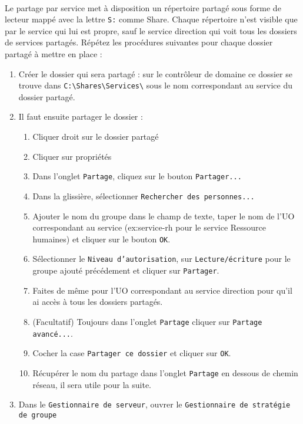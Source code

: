 			\paragraph{}
				Le partage par service met à disposition un répertoire partagé sous forme de lecteur mappé avec la lettre \texttt{S:} comme Share. Chaque répertoire n'est visible que par le service qui lui est propre, sauf le service direction qui voit tous les dossiers de services partagés. Répétez les procédures suivantes pour chaque dossier partagé à mettre en place :
				\begin{enumerate}
					\item Créer le dossier qui sera partagé : sur le contrôleur de domaine ce dossier se trouve dans \texttt{C:\textbackslash{}Shares\textbackslash{}Services\textbackslash} sous le nom correspondant au service du dossier partagé.
					\item Il faut ensuite partager le dossier : 
						\begin{enumerate}
							\item Cliquer droit sur le dossier partagé
							\item Cliquer sur propriétés
							\item Dans l'onglet \texttt{Partage}, cliquez sur le bouton \texttt{Partager...}
							\item Dans la glissière, sélectionner \texttt{Rechercher des personnes...}
							\item Ajouter le nom du groupe dans le champ de texte, taper le nom de l'UO correspondant au service (ex:service-rh pour le service Ressource humaines) et cliquer sur le bouton \texttt{OK}.
							\item Sélectionner le \texttt{Niveau d'autorisation}, sur \texttt{Lecture/écriture} pour le groupe ajouté précédement et cliquer sur \texttt{Partager}.
							\item Faites de même pour l'UO correspondant au service direction pour qu'il ai accès à tous les dossiers partagés.
							\item (Facultatif) Toujours dans l'onglet \texttt{Partage} cliquer sur \texttt{Partage avancé...}.
							\item Cocher la case \texttt{Partager ce dossier} et cliquer sur \texttt{OK}.
							\item Récupérer le nom du partage dans l'onglet \texttt{Partage} en dessous de chemin réseau, il sera utile pour la suite.
						\end{enumerate}  
						\item Dans le \texttt{Gestionnaire de serveur}, ouvrer le \texttt{Gestionnaire de stratégie de groupe}

\end{enumerate}
